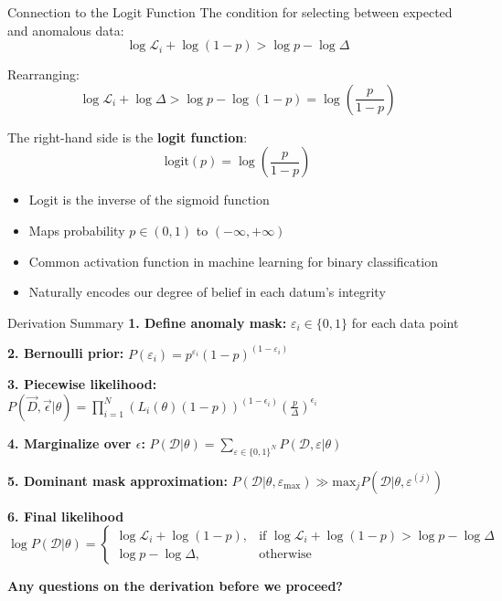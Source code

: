\documentclass[aspectratio=169]{beamer}
\begin{document}
\begin{frame}{Connection to the Logit Function}
  \footnotesize
  The condition for selecting between expected and anomalous data:
  \begin{equation}
    \log \mathcal{L}_i + \log(1-p) > \log p - \log \Delta
  \end{equation}
  
  Rearranging:
  \begin{equation}
    \log \mathcal{L}_i + \log \Delta > \log p - \log(1-p) = \log\left(\frac{p}{1-p}\right)
  \end{equation}
  
  The right-hand side is the \textbf{logit function}:
  \begin{equation}
    \text{logit}(p) = \log\left(\frac{p}{1-p}\right)
  \end{equation}
  
  \begin{itemize}
    \item Logit is the inverse of the sigmoid function
    \item Maps probability $p \in (0,1)$ to $(-\infty, +\infty)$
    \item Common activation function in machine learning for binary classification
    \item Naturally encodes our degree of belief in each datum's integrity
  \end{itemize}
\end{frame}

\begin{frame}{Derivation Summary}
  \footnotesize
  \textbf{1. Define anomaly mask:} $\varepsilon_i \in \{0, 1\}$ for each data point
  
  \textbf{2. Bernoulli prior:} $P(\varepsilon_i) = p^{\varepsilon_i}(1-p)^{(1-\varepsilon_i)}$
  
  \textbf{3. Piecewise likelihood:} $P(\vec{D}, \vec{\epsilon} | \theta) = \prod_{i=1}^{N} \left(L_i(\theta) (1-p)\right)^{(1-\epsilon_i)} \left(\frac{p}{\Delta}\right)^{\epsilon_i}$
  
  \textbf{4. Marginalize over $\epsilon$:} $P(\mathcal{D} | \theta) = \sum_{\varepsilon \in \{ 0, 1 \} ^N}P(\mathcal{D},\varepsilon|\theta)$
  
  \textbf{5. Dominant mask approximation:} $P(\mathcal{D}|\theta, \varepsilon_{\mathrm{max}}) \gg \mathrm{max}_j P(\mathcal{D}|\theta,\varepsilon^{(j)})$
  
  \textbf{6. Final likelihood}
  \begin{equation*}
  \log P(\mathcal{D}|\theta) =
  \begin{cases}
  \log \mathcal{L}_i + \log(1 - p), & \text{if } \log \mathcal{L}_i + \log(1 - p) > \log p - \log \Delta \\
  \log p - \log \Delta, & \text{otherwise}
  \end{cases}
  \end{equation*}
  
  \vfill
  \centering
  \textbf{Any questions on the derivation before we proceed?}
\end{frame}
\end{document}
